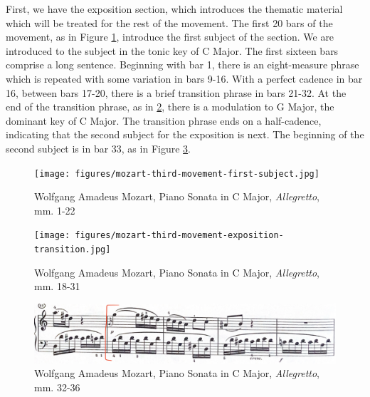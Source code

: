 First, we have the exposition section, which introduces the thematic material which will be treated for the rest of the movement. The first 20 bars of the movement, as in Figure \ref{fig:mozart-third-movement-first-subject}\autocite{Henle_1977}, introduce the first subject of the section. We are introduced to the subject in the tonic key of C Major. The first sixteen bars comprise a long sentence. Beginning with bar 1, there is an eight-measure phrase which is repeated with some variation in bars 9-16. With a perfect cadence in bar 16, between bars 17-20, there is a brief transition phrase in bars 21-32. At the end of the transition phrase, as in \ref{fig:mozart-third-movement-exposition-transition}\autocite{Henle_1977}, there is a modulation to G Major, the dominant key of C Major. The transition phrase ends on a half-cadence, indicating that the second subject for the exposition is next. The beginning of the second subject is in bar 33, as in Figure \ref{fig:mozart-third-movement-beginning-of-second-subject-exposition}\autocite{Henle_1977}. 

\begin{figure}[H]
	\centering
	\texttt{[image: figures/mozart-third-movement-first-subject.jpg]}
	\caption{Wolfgang Amadeus Mozart, Piano Sonata in C Major, \textit{Allegretto}, mm. 1-22}
	\label{fig:mozart-third-movement-first-subject}
\end{figure}

\begin{figure}[H]
  	\centering
  	\texttt{[image: figures/mozart-third-movement-exposition-transition.jpg]}
  	\caption{Wolfgang Amadeus Mozart, Piano Sonata in C Major, \textit{Allegretto}, mm. 18-31}
  	\label{fig:mozart-third-movement-exposition-transition}
\end{figure}

\begin{figure}[H]
	\centering
	\includegraphics[width=\textwidth]{figures/mozart-third-movement-beginning-of-second-subject-exposition.jpg}
	\caption{Wolfgang Amadeus Mozart, Piano Sonata in C Major, \textit{Allegretto}, mm. 32-36}
	\label{fig:mozart-third-movement-beginning-of-second-subject-exposition}
\end{figure}

